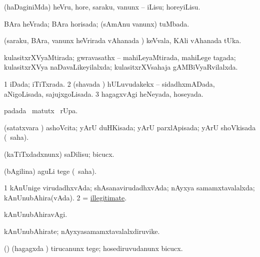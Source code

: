 \bentry
{} 
\gl{\sakirx}
\expl{}
\bmng
(haDaginiMda) heVru, hore, saraku, \mo vanunx -- iLisu; horeyiLisu. 
\emng
\eentry

\bentry
{} 
\gl{\gu}
\expl{}
\bmng
BAra heVrada; BAra horisada; (sAmAnu \mo vanunx) tuMbada. 
\emng

\noindent
\gl{\pagu}
\expl{}
\bmng
{} (saraku, BAra, \mo vanunx heVrirada vAhanada \vi) keVvala, KAli vAhanada tUka. 
\emng
\eentry

\bentry
{} 
\gl{\gu}
\expl{}
\bmng
kulasitxrXVyaMtirada; gwravasathx -- mahiLeyaMtirada, mahiLege tagada; kulasitxrXVya naDavaLikeyilalxda; kulasitxrXVsahaja gAMBiVyaRvilalxda. 
\emng
\eentry

\bentry
{} 
\gl{\gu}
\expl{}
\bmng
\bnum
\num{1} iDada; iTiTxrada. 
\num{2} (shavada \vi) hULuvudakekx -- sidadhxmADada, aNigoLisada, sajujxgoLisada. 
\num{3} hagagxvAgi heNeyada, hoseyada. 
\enum
\emng
\eentry

\bentry
{} 
\gl{\kirx}
\expl{}
\bmng
{} padada \BU\ matutx \BUkaq\ rUpa. 
\emng
\eentry

\bentry
{} 
\gl{\gu}
\expl{}
\bmng
(satatxvara \vi) ashoVcita; yArU duHKisada; yArU parxlApisada; yArU shoVkisada (\rUpa\ saha). 
\emng
\eentry

\bentry
{} 
\gl{\akirx}
\expl{}
\bmng
(kaTiTxdadxnunx) saDilisu; bicucx. 
\emng
\eentry

\bentry
{} 
\gl{\akirx}
\expl{}
\bmng
(bAgilina) aguLi tege (\akirx\ saha). 
\emng
\eentry

\bentry
{} 
\gl{\gu}
\expl{}
\bmng
\bnum
\num{1} kAnUnige virudadhxvAda; shAsanavirudadhxvAda; nAyxya samamxtavalalxda; kAnUnubAhira(vAda). 
\num{2} = \hyperref{kandict_i.pdf}{I}{illegitimate(1)}{illegitimate}. 
\enum
\emng
\eentry

\bentry
{} 
\gl{\kirxvi}
\expl{}
\bmng
kAnUnubAhiravAgi. 
\emng
\eentry

\bentry
{} 
\gl{\nA}
\expl{}
\bmng
kAnUnubAhirate; nAyxyasamamxtavalalxdiruvike. 
\emng
\eentry

\bentry
{} 
\gl{\sakirx}
\bmng
(\nw) (hagagxda \vi) tirucanunx tege; hosediruvudanunx bicucx. 
\emng
\eentry

